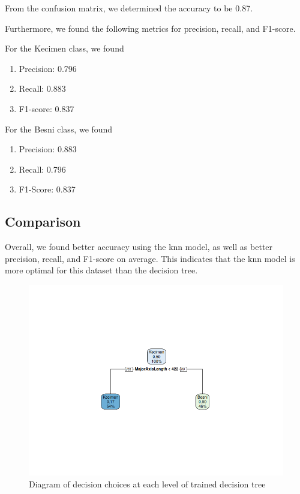 \documentclass{article}
\begin{document}
From the confusion matrix, we determined the accuracy to be 0.87.

Furthermore, we found the following metrics for precision, recall, and F1-score.

For the Kecimen class, we found

\begin{enumerate}
    \item Precision: 0.796

    \item Recall: 0.883

    \item F1-score: 0.837
\end{enumerate}

For the Besni class, we found

\begin{enumerate}
    \item Precision: 0.883

    \item Recall: 0.796

    \item F1-Score: 0.837
\end{enumerate}

\subsection*{Comparison}

Overall, we found better accuracy using the knn model, as well as better precision, recall, and F1-score on average. This indicates that the knn model is more optimal for this dataset than the decision tree.
\clearpage

\begin{figure}[h]
    \centering
    \includegraphics[width=\linewidth]{tree_plot}
    \caption{Diagram of decision choices at each level of trained decision tree}
    \label{fig:tree_plot}
\end{figure}
\end{document}
